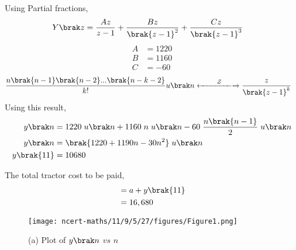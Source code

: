 \documentclass[journal,12pt,onecolumn]{IEEEtran}
\theoremstyle{remark}
\begin{document}
	Using Partial fractions,
	\begin{align}
		Y\brak z &= \dfrac{A z}{z-1} + \dfrac{B z}{\brak{z-1}^2} + \dfrac{C z}{\brak{z-1}^3}
	\end{align}
	\begin{align}
		A &= 1220\\
		B &= 1160\\
		C &= -60
	\end{align}
	\begin{align}
		\dfrac{n\brak{n-1}\brak{n-2}...\brak{n-k-2}}{k!} u\brak n &
		\xleftarrow[]{\hspace{0.8cm}{\mathcal{Z}}\hspace{0.4cm}}\xrightarrow[]{}
		\dfrac{z}{\brak{z - 1}^k}
	\end{align}
	Using this result,
	\begin{align}
		y\brak n &= 1220 \hspace{0.1cm} u\brak n + 1160 \hspace{0.1cm} n \hspace{0.1cm} u\brak n - 60 \hspace{0.1cm} \dfrac{n\brak{n-1}}{2}\hspace{0.1cm} u\brak n \\
		y\brak n &= \brak{1220 + 1190n - 30n^2} \hspace{0.1cm} u\brak n \\
		y\brak {11} &= 10680
	\end{align}
	
	The total tractor cost to be paid,
	\begin{align}
		&= a + y\brak {11}\\
		&= 16,680
	\end{align}
	
	
	\begin{figure}[htbp]
		\centering
		\texttt{[image: ncert-maths/11/9/5/27/figures/Figure1.png]}
		\caption{(a) Plot of $y\brak n$ $vs$ $n$}
		
	\end{figure}
	
\end{document}
